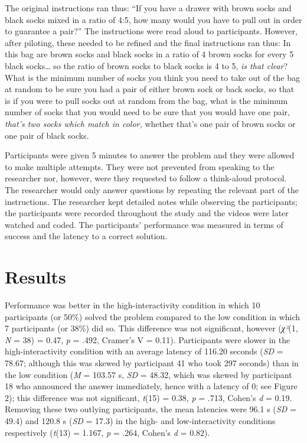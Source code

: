 {{The original instructions ran thus: ``If you have a drawer with brown socks and black socks mixed in a ratio of 4:5, how many would you have to pull out in order to guarantee a pair?'' The instructions were read aloud to participants. However, after piloting, these needed to be refined and the final instructions ran thus: In this bag are brown socks and black socks in a ratio of 4 brown socks for every 5 black socks\ldots{} so the ratio of brown socks to black socks is 4 to 5, \emph{is that clear}? What is the minimum number of socks you think you need to take out of the bag at random to be sure you had a pair of either brown sock or back socks, so that is if you were to pull socks out at random from the bag, what is the minimum number of socks that you would need to be sure that you would have one pair, \emph{that's two socks which match in color,} whether that's one pair of brown socks or one pair of black socks.

Participants were given 5 minutes to answer the problem and they were allowed to make multiple attempts. They were not prevented from speaking to the researcher nor, however, were they requested to follow a think-aloud protocol. The researcher would only answer questions by repeating the relevant part of the instructions. The researcher kept detailed notes while observing the participants; the participants were recorded throughout the study and the videos were later watched and coded. The participants' performance was measured in terms of success and the latency to a correct solution.


\section{Results}

Performance was better in the high-interactivity condition in which 10 participants (or 50\%) solved the problem compared to the low condition in which 7 participants (or 38\%) did so. This difference was not significant, however (\emph{χ²}(1, \emph{N} = 38) = 0.47, \emph{p} = .492, Cramer's V = 0.11). Participants were slower in the high-interactivity condition with an average latency of 116.20 seconds (\emph{SD} = 78.67; although this was skewed by participant 41 who took 297 seconds) than in the low condition (\emph{M} = 103.57 s, \emph{SD} = 48.32, which was skewed by participant 18 who announced the answer immediately, hence with a latency of 0; see Figure 2); this difference was not significant, \emph{t}(15) = 0.38, \emph{p} = .713, Cohen's \emph{d} = 0.19. Removing these two outlying participants, the mean latencies were 96.1 s (\emph{SD} = 49.4) and 120.8 s (\emph{SD} = 17.3) in the high- and low-interactivity conditions respectively (\emph{t}(13) = 1.167, \emph{p} = .264, Cohen's \emph{d} = 0.82).


}}
